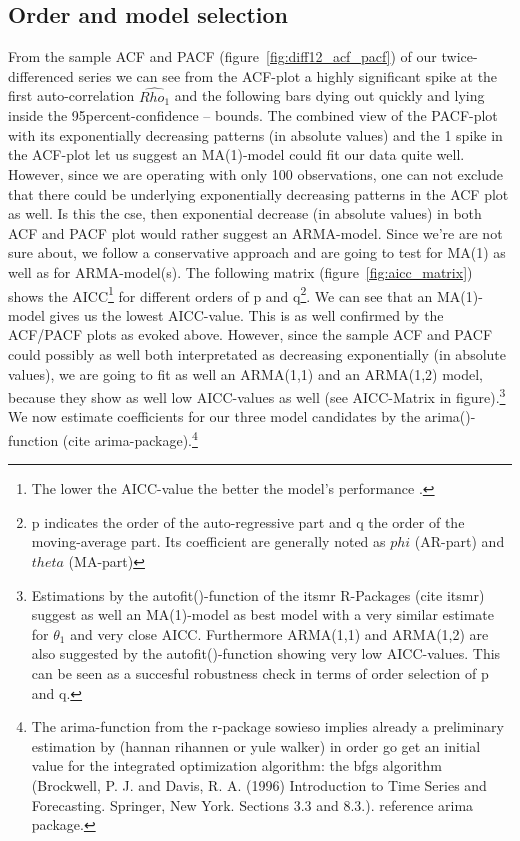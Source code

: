 \documentclass[11pt,a4paper]{article}
\begin{document}
\subsection{Order and model selection}
From the sample ACF and PACF (figure~\ref{fig:diff12_acf_pacf}) of our twice-differenced series we can see from the ACF-plot a highly significant spike at the first auto-correlation $\hat{Rho_1}$ and the following bars dying out quickly and lying inside the 95percent-confidence – bounds. The combined view of the PACF-plot with its exponentially decreasing patterns (in absolute values) and the 1 spike in the ACF-plot let us suggest an MA(1)-model could fit our data quite well.
However, since we are operating with only 100 observations, one can not exclude that there could be underlying exponentially decreasing patterns in the ACF plot as well. Is this the cse, then exponential decrease (in absolute values) in both ACF and PACF plot would rather suggest an ARMA-model. Since  we’re are not sure about, we follow a conservative approach and are going to test for MA(1) as well as for ARMA-model(s).
The following matrix (figure~\ref{fig:aicc_matrix}) shows the AICC\footnote{The lower the AICC-value the better the model's performance \citep{aic86}.} for different orders of p and q\footnote{p indicates the order of the auto-regressive part and q the order of the moving-average part. Its coefficient are generally noted as $phi$ (AR-part) and $theta$ (MA-part)}.  We can see that an MA(1)-model gives us the lowest AICC-value. This is as well confirmed by the ACF/PACF plots as evoked above. However, since the sample ACF and PACF could possibly as well both interpretated as decreasing exponentially (in absolute values), we are going to fit as well an ARMA(1,1) and an ARMA(1,2) model, because they show as well low AICC-values as well (see AICC-Matrix in figure).\footnote{Estimations by the autofit()-function of the itsmr R-Packages (cite itsmr) suggest as well an MA(1)-model as best model with a very similar estimate for $\theta_1$ and very close AICC. Furthermore ARMA(1,1) and ARMA(1,2) are also suggested by the autofit()-function showing very low AICC-values. This can be seen as a succesful robustness check in terms of order selection of p and q.}\\
We now estimate coefficients for our three model candidates by the arima()-function (cite arima-package).\footnote{The arima-function from the r-package sowieso implies already a preliminary estimation by (hannan rihannen or yule walker) in order go get an initial value for the integrated optimization algorithm: the bfgs algorithm (Brockwell, P. J. and Davis, R. A. (1996) Introduction to Time Series and Forecasting. Springer, New York. Sections 3.3 and 8.3.).  reference arima package.}
\end{document}
